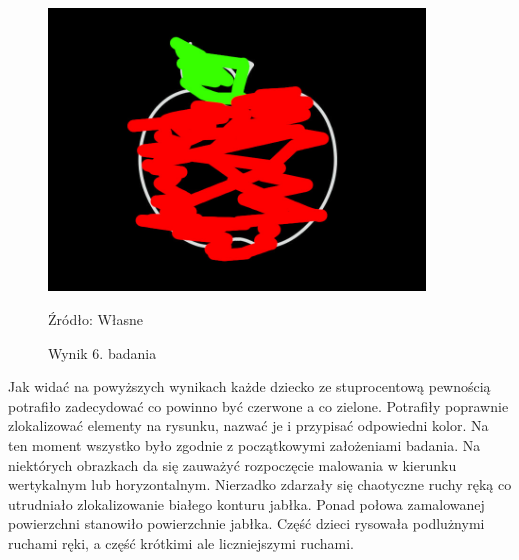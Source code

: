 \documentclass{article}
\begin{document}
\begin{figure}[bp!]
	\centering
	\includegraphics[width=10cm]{wyniki/6}
	\caption{Wynik 6. badania}
	Źródło: Własne
\end{figure}

\par Jak widać na powyższych wynikach każde dziecko ze stuprocentową pewnością potrafiło zadecydować co powinno być czerwone a co zielone. Potrafiły poprawnie zlokalizować elementy na rysunku, nazwać je i przypisać odpowiedni kolor. Na ten moment wszystko było zgodnie z początkowymi założeniami badania. Na niektórych obrazkach da się zauważyć rozpoczęcie malowania w kierunku wertykalnym lub horyzontalnym. Nierzadko zdarzały się chaotyczne ruchy ręką co utrudniało zlokalizowanie białego konturu jabłka. Ponad połowa zamalowanej powierzchni stanowiło powierzchnie jabłka. Część dzieci rysowała podlużnymi ruchami ręki, a część krótkimi ale liczniejszymi ruchami.
\end{document}
